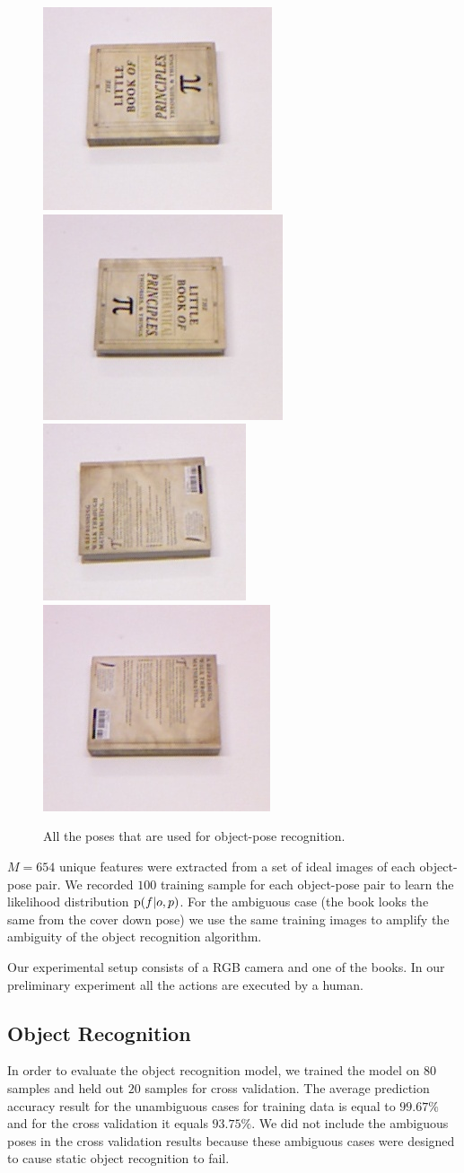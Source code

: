     
     \begin{figure}
     \centering
    		\includegraphics[width = 0.2\columnwidth]{pics/math_cover1.jpg}
    		\includegraphics[width = 0.2\columnwidth]{pics/math_cover1_rot.jpg}
    		\includegraphics[width = 0.2\columnwidth]{pics/math_down.jpg}
    		\includegraphics[width = 0.2\columnwidth]{pics/math_down_rot.jpg}
    		\caption{All the poses that are used for object-pose recognition.}
	\label{fig:pose_dataset}
    \end{figure}       
    
    
$M = 654$ unique features were extracted from a set of ideal images of each object-pose pair. We recorded $100$ training sample for each object-pose pair to learn the likelihood distribution $\text{p}(f|o,p)$. For the ambiguous case (the book looks the same from the cover down pose) we use the same training images to amplify the ambiguity of the object recognition algorithm.

    Our experimental setup consists of a RGB camera and one of the books. In our preliminary experiment all the actions are executed by a human.

    \subsection{Object Recognition}
    
	In order to evaluate the object recognition model, we trained the model on $80$ samples and held out $20$ samples for cross validation. The average prediction accuracy result for the unambiguous cases for training data is equal to $99.67\%$ and for the cross validation it equals $93.75\%$. We did not include the ambiguous poses in the cross validation results because these ambiguous cases were designed to cause static object recognition to fail.    
    
